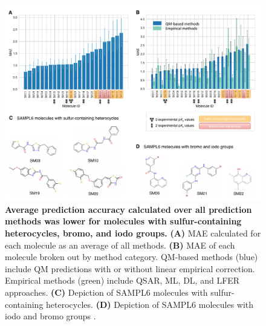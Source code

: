 \documentclass[9pt,lineno,final]{elife}
\begin{document}









\begin{figure}
\centering
\includegraphics[width=1.0\linewidth]{figures/typeIII_molecular_MAE_fig.pdf}
\caption{{\bf Average prediction accuracy calculated over all prediction methods was lower for molecules with sulfur-containing heterocycles, bromo, and iodo groups.}
{\bf(A)} MAE calculated for each molecule as an average of all methods. {\bf(B)} MAE of each molecule broken out by method category. QM-based methods (blue) include QM predictions with or without linear empirical correction. Empirical methods (green) include QSAR, ML, DL, and LFER approaches. {\bf(C)} Depiction of SAMPL6 molecules with sulfur-containing heterocycles. {\bf(D)} Depiction of SAMPL6 molecules with iodo and bromo groups .
}
\label{fig:typeIII_molecular_MAE}
\end{figure}
\end{document}
